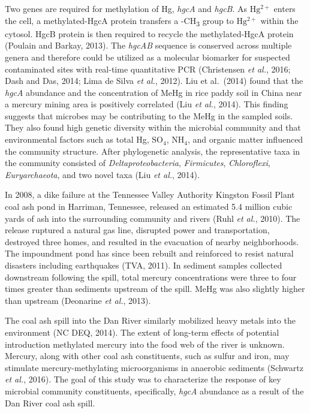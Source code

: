 \documentclass[ms, hidelinks]{uncgdissertationexp3}
\theoremstyle{plain}
\theoremstyle{definition}
\theoremstyle{remark}
\begin{document}
Two genes are required for methylation of Hg, \emph{hgcA} and \emph{hgcB}. As \(\mathrm{Hg^{2+}}\) enters the cell, a methylated-HgcA protein transfers a -CH\textsubscript{3} group to \(\mathrm{Hg^{2+}}\) within the cytosol. HgcB protein is then required to recycle the methylated-HgcA protein (Poulain and Barkay, 2013). The \emph{hgcAB} sequence is conserved across multiple genera and therefore could be utilized as a molecular biomarker for suspected contaminated sites with real-time quantitative PCR (Christensen \emph{et al.}, 2016; Dash and Das, 2014; Lima de Silva \emph{et al.}, 2012). Liu et al.~(2014) found that the \emph{hgcA} abundance and the concentration of MeHg in rice paddy soil in China near a mercury mining area is positively correlated (Liu \emph{et al.}, 2014). This finding suggests that microbes may be contributing to the MeHg in the sampled soils. They also found high genetic diversity within the microbial community and that environmental factors such as total Hg, \(\mathrm{SO_4}\), \(\mathrm{NH_4}\), and organic matter influenced the community structure. After phylogenetic analysis, the representative taxa in the community consisted of \emph{Deltaproteobacteria}, \emph{Firmicutes}, \emph{Chloroflexi}, \emph{Euryarchaeota}, and two novel taxa (Liu \emph{et al.}, 2014).

In 2008, a dike failure at the Tennessee Valley Authority Kingston Fossil Plant coal ash pond in Harriman, Tennessee, released an estimated 5.4 million cubic yards of ash into the surrounding community and rivers (Ruhl \emph{et al.}, 2010). The release ruptured a natural gas line, disrupted power and transportation, destroyed three homes, and resulted in the evacuation of nearby neighborhoods. The impoundment pond has since been rebuilt and reinforced to resist natural disasters including earthquakes (TVA, 2011). In sediment samples collected downstream following the spill, total mercury concentrations were three to four times greater than sediments upstream of the spill. MeHg was also slightly higher than upstream (Deonarine \emph{et al.}, 2013).

The coal ash spill into the Dan River similarly mobilized heavy metals into the environment (NC DEQ, 2014). The extent of long-term effects of potential introduction methylated mercury into the food web of the river is unknown. Mercury, along with other coal ash constituents, such as sulfur and iron, may stimulate mercury-methylating microorganisms in anaerobic sediments (Schwartz \emph{et al.}, 2016). The goal of this study was to characterize the response of key microbial community constituents, specifically, \emph{hgcA} abundance as a result of the Dan River coal ash spill.
\end{document}
